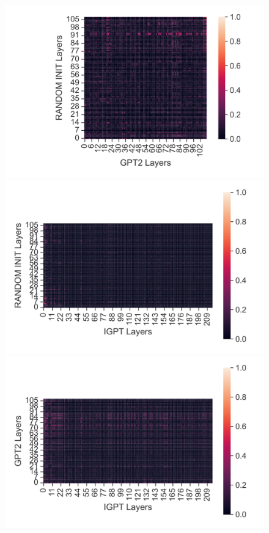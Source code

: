 \documentclass{article}
\begin{document}
\begin{figure}[H]
    \centering
    \begin{minipage}[b]{0.32\linewidth}
        \includegraphics[width=\linewidth]{figs/cka_40_40_dtgpt2_walker2d_medium_666_state.png}
    \end{minipage}
    \begin{minipage}[b]{0.32\linewidth}
        \includegraphics[width=\linewidth]{figs/cka_40_40_dtigpt_walker2d_medium_666_state.png}
    \end{minipage}
    \begin{minipage}[b]{0.32\linewidth}
        \includegraphics[width=\linewidth]{figs/cka_40_40_gpt2igpt_walker2d_medium_666_state.png}

\end{minipage}
\end{figure}
\end{document}
